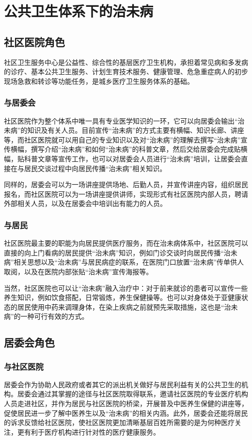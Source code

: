 \section{公共卫生体系下的治未病}
\subsection{社区医院角色}
社区卫生服务中心是公益性、综合性的基层医疗卫生机构，承担着常见病和多发病的诊疗、基本公共卫生服务、计划生育技术服务、健康管理、危急重症病人的初步现场急救和转诊等功能任务，是城乡医疗卫生服务体系的基础。
\subsubsection{与居委会}
社区医院作为整个体系中唯一具有专业医学知识的一环，它可以向居委会输出“治未病”的知识及有关人员。目前宣传“治未病”的方式主要有横幅、知识长廊、讲座等，而社区医院就可以用自己的专业知识以及对“治未病”的理解去撰写“治未病”宣传横幅，撰写介绍“治未病”和如何“治未病”的科普文章，然后交给居委会完成贴横幅，贴科普文章等宣传工作，也可以对居委会人员进行“治未病”培训，让居委会直接在与居民交谈过程中向居民传播“治未病”相关知识。

同样的，居委会可以为一场讲座提供场地、后勤人员，并宣传讲座内容，组织居民报名，而社区医院可以为一场讲座提供讲师，实现形式有社区医院内部人员，聘请外部相关人员，以及在居委会中培训出有能力的人员。
\subsubsection{与居民}
社区医院最主要的职能为向居民提供医疗服务，而在治未病体系中，社区医院可以直接的向上门看病的居民提供“治未病”知识，例如门诊交谈时向居民传播“治未病”相关思想以及“治未病”与居民病症的联系，在医院门口放置“治未病”传单供人取阅，以及在医院内部张贴“治未病”宣传海报等。

当然，社区医院也可以让“治未病”融入治疗中：对于前来就诊的患者可以宣传一些养生知识，例如饮食搭配，日常锻炼，养生保健操等。也可以对身体处于亚健康状态的居民使用中药来调理身体，在染上疾病之前就预先采取措施，这也是“治未病”的一种可行有效的方式。
\subsection{居委会角色}
\subsubsection{与社区医院}
居委会作为协助人民政府或者其它的派出机关做好与居民利益有关的公共卫生的机构。居委会通过其掌握的途径与社区医院取得联系，邀请社区医院的专业医疗机构人员走进社区，并作为居民与社区医院的桥梁，开展普及中医养生保健的讲座等，促使居民进一步了解中医养生以及“治未病”的相关内涵。此外，居委会还能将居民的诉求反馈给社区医院，使社区医院更加清晰基层百姓所需要的是为何种医疗关注，更有利于医疗机构进行针对性的医疗健康服务。

